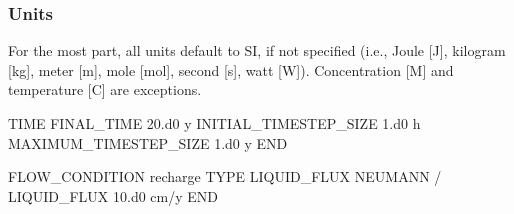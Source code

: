 \begin{frame}\frametitle{Units}

For the most part, all units default to SI, if not specified (i.e., Joule [J], kilogram [kg], meter [m], mole [mol], second [s], watt [W]). Concentration [M] and temperature [C] are exceptions.

\begin{semiverbatim}
  TIME
    FINAL_TIME 20.d0 y
    INITIAL_TIMESTEP_SIZE 1.d0 h
    MAXIMUM_TIMESTEP_SIZE 1.d0 y
  END
\end{semiverbatim}

\begin{semiverbatim}
  FLOW_CONDITION recharge
    TYPE
      LIQUID_FLUX NEUMANN
    /
    LIQUID_FLUX 10.d0 cm/y
  END
\end{semiverbatim}

\end{frame}

